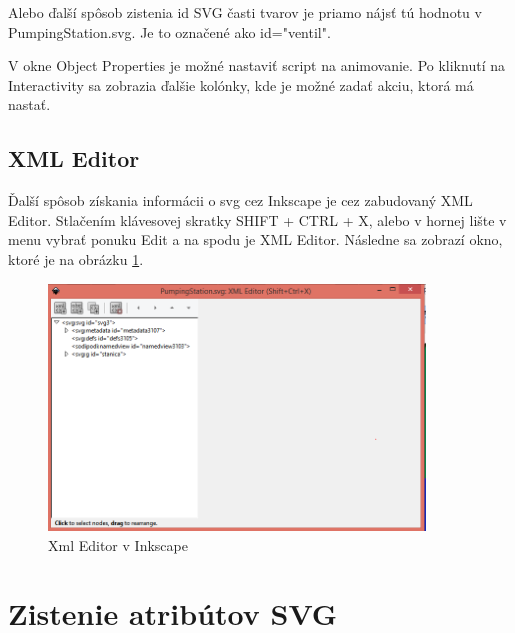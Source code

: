 Alebo ďalší spôsob zistenia id SVG časti tvarov je priamo nájsť tú hodnotu v PumpingStation.svg. Je to označené ako id="ventil".

V okne Object Properties je možné nastaviť script na animovanie. Po kliknutí na Interactivity sa zobrazia ďalšie kolónky, kde je možné zadať akciu, ktorá má nastať.  



\subsection{XML Editor}
Ďalší spôsob získania informácii o svg cez Inkscape je cez zabudovaný XML Editor.
Stlačením klávesovej skratky SHIFT + CTRL + X, alebo v hornej lište v menu vybrať ponuku Edit a na spodu je XML Editor. Následne sa zobrazí okno, ktoré je na obrázku \ref{xmlEditor}.
\begin{figure}[ht]
	\begin{center}
		\includegraphics[width=10cm]  {obrazky/XmlEditor.png}
		\caption{Xml Editor v Inkscape}
		\label{xmlEditor}
	\end{center}
\end{figure}


\section{Zistenie atribútov SVG}

